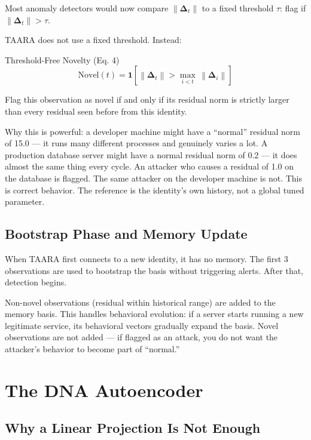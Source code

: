 \documentclass[11pt,a4paper]{article}
\newcommand{\norm}[1]{\left\lVert#1\right\rVert}
\begin{document}
Most anomaly detectors would now compare $\norm{\boldsymbol{\Delta}_t}$ to a fixed threshold $\tau$: flag if $\norm{\boldsymbol{\Delta}_t} > \tau$.

TAARA does not use a fixed threshold. Instead:

\begin{mathblock}{Threshold-Free Novelty (Eq. 4)}
\[
\text{Novel}(t) = \mathbf{1}\!\left[\norm{\boldsymbol{\Delta}_t} > \max_{i < t}\, \norm{\boldsymbol{\Delta}_i}\right] \tag{4}
\]
\end{mathblock}

Flag this observation as novel if and only if its residual norm is strictly larger than every residual seen before from this identity.

Why this is powerful: a developer machine might have a ``normal'' residual norm of 15.0 — it runs many different processes and genuinely varies a lot. A production database server might have a normal residual norm of 0.2 — it does almost the same thing every cycle. An attacker who causes a residual of 1.0 on the database is flagged. The same attacker on the developer machine is not. This is correct behavior. The reference is the identity's own history, not a global tuned parameter.

\subsection{Bootstrap Phase and Memory Update}

When TAARA first connects to a new identity, it has no memory. The first 3 observations are used to bootstrap the basis without triggering alerts. After that, detection begins.

Non-novel observations (residual within historical range) are added to the memory basis. This handles behavioral evolution: if a server starts running a new legitimate service, its behavioral vectors gradually expand the basis. Novel observations are not added — if flagged as an attack, you do not want the attacker's behavior to become part of ``normal.''

\section{The DNA Autoencoder}

\subsection{Why a Linear Projection Is Not Enough}
\end{document}

